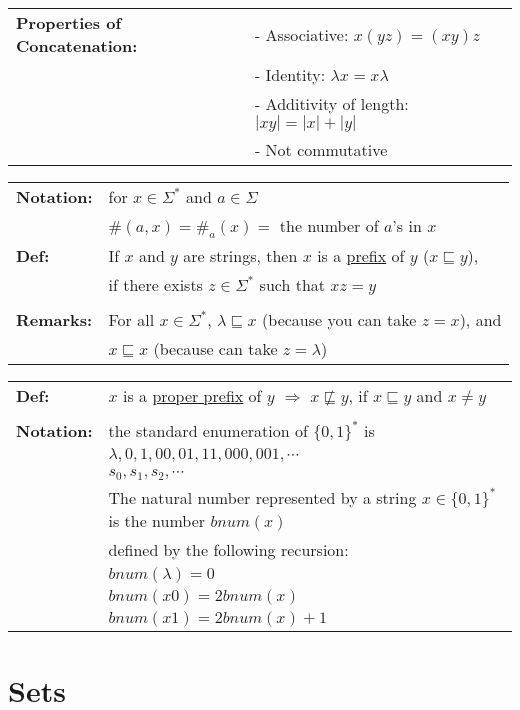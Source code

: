 \documentclass[11pt]{article}
\begin{document}
\begin{tabular}{ll}
{\bf Properties of Concatenation:} & - Associative: $x(yz)=(xy)z$ \\
& - Identity: $\lambda x = x\lambda$\\
& - Additivity of length: $|xy| = |x| + |y|$\\
& - Not commutative
\end{tabular}

\begin{tabular}{ll}
{\bf Notation:} & for $x\in\Sigma^*$ and $a\in\Sigma$ \\
& $\#(a,x)=\#_a(x)=$ the number of $a$'s in $x$\\
{\bf Def:} & If $x$ and $y$ are strings, then $x$ is a \underline{prefix} of $y$ ($x\sqsubseteq y$),\\ 
& if there exists $z\in\Sigma^*$ such that $xz=y$\\
\\
{\bf Remarks:} & For all $x\in\Sigma^*$, $\lambda \sqsubseteq x$ (because you can take $z=x$), and \\
& $x \sqsubseteq x$ (because can take $z=\lambda$)\\
\end{tabular}

\newpage

\begin{tabular}{ll}
{\bf Def:} & $x$ is a \underline{proper prefix} of $y$ $\Rightarrow$ $x \not\sqsubseteq y$, if $x \sqsubseteq y$ and $x \neq y$\\
\\
{\bf Notation:} & the standard enumeration of $\{0,1\}^*$ is \\
& $\lambda,0,1,00,01,11,000,001,\cdots$\\
& $s_0,s_1,s_2,\cdots$\\
& The natural number represented by a string $x\in\{0,1\}^*$ is the number $\textit{bnum}(x)$\\
& defined by the following recursion: \\
& $\textit{bnum}(\lambda) = 0$ \\
& $\textit{bnum}(x0) = 2\textit{bnum}(x)$ \\
& $\textit{bnum}(x1) = 2\textit{bnum}(x) + 1$
\end{tabular}

\section{Sets}
\end{document}

